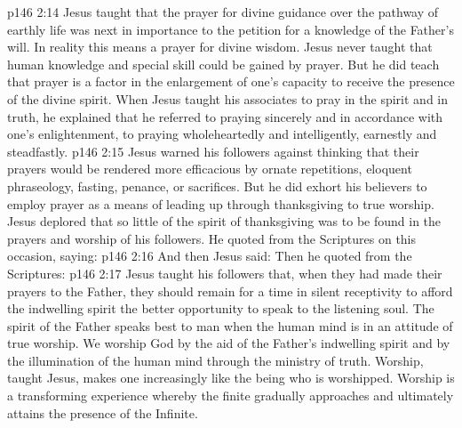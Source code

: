 \vs p146 2:14 \bibnobreakspace Jesus taught that the prayer for divine guidance over the pathway of earthly life was next in importance to the petition for a knowledge of the Father’s will. In reality this means a prayer for divine wisdom. Jesus never taught that human knowledge and special skill could be gained by prayer. But he did teach that prayer is a factor in the enlargement of one’s capacity to receive the presence of the divine spirit. When Jesus taught his associates to pray in the spirit and in truth, he explained that he referred to praying sincerely and in accordance with one’s enlightenment, to praying wholeheartedly and intelligently, earnestly and steadfastly.
\vs p146 2:15 \bibnobreakspace Jesus warned his followers against thinking that their prayers would be rendered more efficacious by ornate repetitions, eloquent phraseology, fasting, penance, or sacrifices. But he did exhort his believers to employ prayer as a means of leading up through thanksgiving to true worship. Jesus deplored that so little of the spirit of thanksgiving was to be found in the prayers and worship of his followers. He quoted from the Scriptures on this occasion, saying: 
\vs p146 2:16 \bibnobreakspace And then Jesus said:  Then he quoted from the Scriptures: 
\vs p146 2:17 \bibnobreakspace Jesus taught his followers that, when they had made their prayers to the Father, they should remain for a time in silent receptivity to afford the indwelling spirit the better opportunity to speak to the listening soul. The spirit of the Father speaks best to man when the human mind is in an attitude of true worship. We worship God by the aid of the Father’s indwelling spirit and by the illumination of the human mind through the ministry of truth. Worship, taught Jesus, makes one increasingly like the being who is worshipped. Worship is a transforming experience whereby the finite gradually approaches and ultimately attains the presence of the Infinite.
